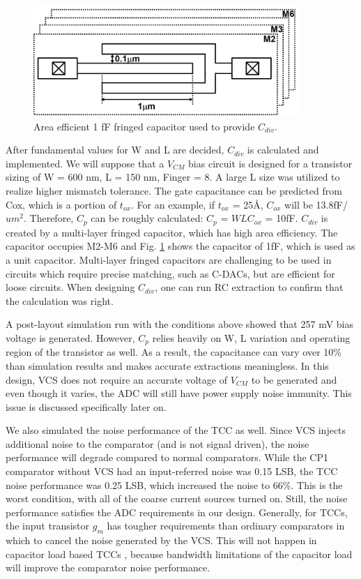 \begin{figure}
\centering
  \includegraphics[width=0.9\textwidth]{figure/chap4/fig7.jpg}
  \caption{Area efficient 1 fF fringed capacitor used to provide $C_{div}$.}
  \label{fig-4-7}
\end{figure}

After fundamental values for W and L are decided, $C_{div}$ is calculated and implemented. We will suppose that a $V_{CM}$ bias circuit is designed for a transistor sizing of W = 600 nm, L = 150 nm, Finger = 8. A large L size was utilized to realize higher mismatch tolerance. The gate capacitance can be predicted from Cox, which is a portion of $t_{ox}$. For an example, if $t_{ox}$ = 25\AA, $C_{ox}$ will be 13.8fF/$um^2$. Therefore, $C_p$ can be roughly calculated: $C_p$ = $WLC_{ox}$ = 10fF. $C_{div}$ is created by a multi-layer fringed capacitor, which has high area efficiency. The capacitor occupies M2-M6 and Fig. \ref{fig-4-7} shows the capacitor of 1fF, which is used as a unit capacitor. Multi-layer fringed capacitors are challenging to be used in circuits which require precise matching, such as C-DACs, but are efficient for loose circuits. When designing $C_{div}$, one can run RC extraction to confirm that the calculation was right. 

A post-layout simulation run with the conditions above showed that 257 mV bias voltage is generated. However, $C_p$ relies heavily on W, L variation and operating region of the transistor as well. As a result, the capacitance can vary over 10\% than simulation results and makes accurate extractions meaningless. In this design, VCS does not require an accurate voltage of $V_{CM}$ to be generated and even though it varies, the ADC will still have power supply noise immunity. This issue is discussed specifically later on.

We also simulated the noise performance of the TCC as well. Since VCS injects additional noise to the comparator (and is not signal driven), the noise performance will degrade compared to normal comparators. While the CP1 comparator without VCS had an input-referred noise was 0.15 LSB, the TCC noise performance was 0.25 LSB, which increased the noise to 66\%. This is the worst condition, with all of the coarse current sources turned on. Still, the noise performance satisfies the ADC requirements in our design.
Generally, for TCCs, the input transistor $g_m$ has tougher requirements than ordinary comparators in which to cancel the noise generated by the VCS. This will not happen in capacitor load based TCCs \cite{nuzzo-thresholdconfiguring}, because bandwidth limitations of the capacitor load will improve the comparator noise performance.


